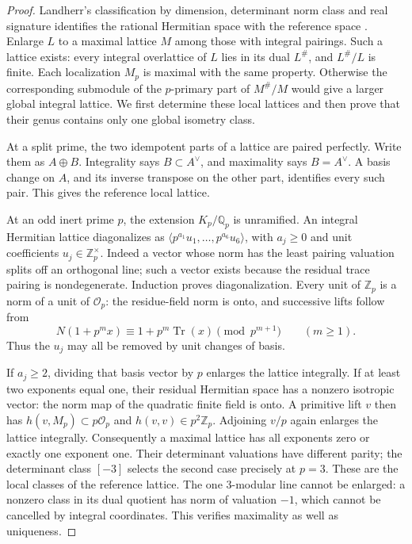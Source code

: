 \documentclass[11pt]{article}
\theoremstyle{definition}
\theoremstyle{remark}
\begin{document}
\begin{proof}
Landherr's classification by dimension, determinant norm class and real
signature identifies the rational Hermitian space with the reference
space \cite[pp.~246--247]{GaussianLandherr}.
Enlarge $L$ to a maximal lattice $M$ among those with integral pairings.
Such a lattice exists: every integral overlattice of $L$ lies in its dual
$L^\#$, and $L^\#/L$ is finite.  Each localization $M_p$ is maximal
with the same property.  Otherwise the corresponding submodule of the
$p$-primary part of $M^\#/M$ would give a larger global integral lattice.
We first determine these local lattices and then prove that their genus
contains only one global isometry class.

At a split prime, the two idempotent parts of a lattice are paired
perfectly.  Write them as $A\oplus B$.  Integrality says
$B\subset A^\vee$, and maximality says $B=A^\vee$.  A basis change
on $A$, and its inverse transpose on the other part, identifies every
such pair.  This gives the reference local lattice.

At an odd inert prime $p$, the extension $K_p/\mathbb Q_p$ is
unramified.  An integral Hermitian lattice diagonalizes as
$\langle p^{a_1}u_1,\ldots,p^{a_6}u_6\rangle$, with $a_j\ge0$ and
unit coefficients $u_j\in\mathbb Z_p^\times$.
Indeed a vector whose norm has the least pairing valuation splits off
an orthogonal line; such a vector exists because the residual trace
pairing is nondegenerate.  Induction proves diagonalization.
Every unit of $\mathbb Z_p$ is a norm of a unit of $\mathcal O_p$:
the residue-field norm is onto, and successive lifts follow from
\[
 N(1+p^m x)\equiv1+p^m\operatorname{Tr}(x)\pmod{p^{m+1}}
 \qquad(m\ge1).
\]
Thus the $u_j$ may all be removed by unit changes of basis.

If $a_j\ge2$, dividing that basis vector by $p$ enlarges the lattice
integrally.  If at least two exponents equal one, their residual
Hermitian space has a nonzero isotropic vector: the norm map of the
quadratic finite field is onto.  A primitive lift $v$ then has
$h(v,M_p)\subset p\mathcal O_p$ and $h(v,v)\in p^2\mathbb Z_p$.
Adjoining $v/p$ again enlarges the lattice integrally.
Consequently a maximal lattice has all exponents zero or exactly one
exponent one.  Their determinant valuations have different parity;
the determinant class $[-3]$ selects the second case precisely at
$p=3$.  These are the local classes of the reference lattice.  The
one $3$-modular line cannot be enlarged: a nonzero class in its dual
quotient has norm of valuation $-1$, which cannot be cancelled by
integral coordinates.  This verifies maximality as well as uniqueness.


\end{proof}
\end{document}
